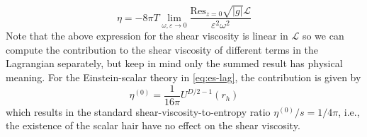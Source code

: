 \documentclass[a4paper,11pt]{article}
\begin{document}
\begin{equation}\label{eq:pole-formula}
    \eta = -8\pi T \lim_{\omega, \varepsilon \to 0} \frac{\mathrm{Res}_{z = 0} \sqrt{|g|}\mathcal L}{\varepsilon^2 \omega^2}
\end{equation}
Note that the above expression for the shear viscosity is linear in $\mathcal L$ so we can compute the contribution to the shear viscosity of different terms in the Lagrangian separately, but keep in mind only the summed result has physical meaning. For the Einstein-scalar theory in \eqref{eq:es-lag}, the contribution is given by
\begin{equation}
    \eta^{(0)} = \frac{1}{16\pi}U^{D/2 - 1}(r_h)
\end{equation}
which results in the standard shear-viscosity-to-entropy ratio $\eta^{(0)} / s = 1/4\pi$, i.e., the existence of the scalar hair have no effect on the shear viscosity.
\end{document}
